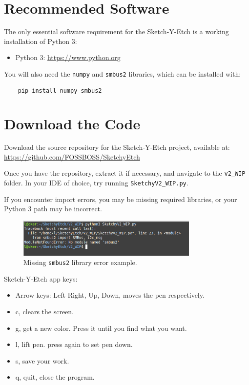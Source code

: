 \documentclass[]{article}
\begin{document}
\section*{Recommended Software}

The only essential software requirement for the Sketch-Y-Etch is a working installation of Python 3:
\begin{itemize}
	\item Python 3: \url{https://www.python.org}
\end{itemize}
You will also need the \texttt{numpy} and \texttt{smbus2} libraries, which can be installed with:

\begin{verbatim}
	pip install numpy smbus2
\end{verbatim}




\section*{Download the Code}
Download the source repository for the Sketch-Y-Etch project, available at:  
\url{https://github.com/FOSSBOSS/SketchyEtch}

Once you have the repository, extract it if necessary, and navigate to the \texttt{v2\_WIP} folder.  
In your IDE of choice, try running \texttt{SketchyV2\_WIP.py}.

If you encounter import errors, you may be missing required libraries, or your Python 3 path may be incorrect.

\begin{figure}[ht]
	\centering
	\includegraphics[width=0.8\textwidth]{missing.png}
	\caption{Missing \texttt{smbus2} library error example.}
	\label{fig:missing_smbus2}
\end{figure}

Sketch-Y-Etch app keys:
\begin{itemize}
	\item Arrow keys: Left Right, Up, Down, moves the pen respectively.
	\item c, clears the screen.
	\item g, get a new color. Press it until you find what you want.
	\item l, lift pen. press again to set pen down.
	\item s, save your work. 
	\item q, quit, close the program.
\end{itemize}
\end{document}
